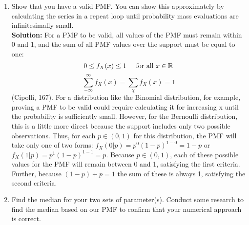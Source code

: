 \documentclass{article}\usepackage[]{graphicx}\usepackage[]{color}
\begin{document}
\begin{enumerate}
	\item Show that you have a valid PMF. You can show this approximately by 
	calculating the series in a repeat loop until probability mass evaluations are 
	infinitesimally small.\\
  
  \textbf{Solution:}
  For a PMF to be valid, all values of the PMF must remain within 0 and 1, and the sum of all PMF values over the support must be equal to one:
$$ 0\leq f_X(x)\leq 1 \hspace{.5cm} \text{for all } x \in \mathbb{R}$$
$$\sum_{-\infty}^{\infty} f_X(x)=\sum_{\chi} f_X(x)=1$$
(Cipolli, 167).  For a distribution like the Binomial distribution, for example, proving a PMF to be valid could require calculating it for increasing x until the probability is sufficiently small.  However, for the Bernoulli distribution, this is a little more direct because the support includes only two possible observations.  Thus, for each $p\in (0,1)$ for this distribution, the PMF will take only one of two forms:
$f_X(0|p)=p^0(1-p)^{1-0}=1-p$ or $f_X(1|p)=p^1(1-p)^{1-1}=p$.  Because $p\in (0,1)$, each of these possible values for the PMF will remain between 0 and 1, satisfying the first criteria.  Further, because $(1-p)+p=1$ the sum of these is always 1, satisfying the second criteria.
	\item Find the median for your two sets of parameter(s). Conduct some research 
	to find the median based on our PMF to confirm that your numerical approach is
	correct.\\
  

\end{enumerate}
\end{document}
